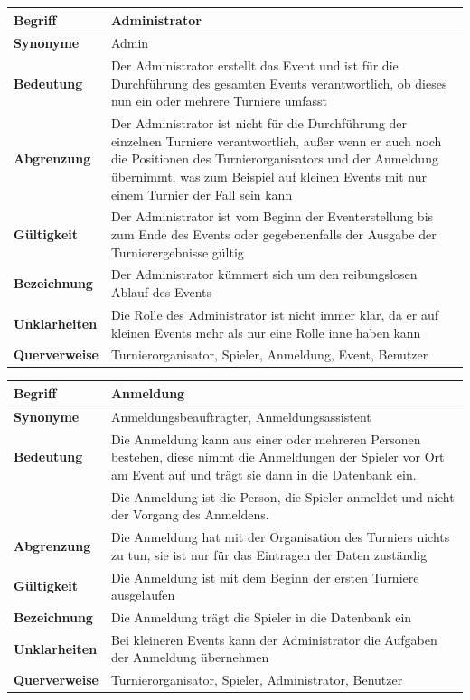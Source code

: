 \documentclass[11pt]{article}
\begin{document}
\begin{tabularx}{\textwidth}{| p{} | p{} |}
	\hline
	\textbf{Begriff} & Administrator\\
	\hline
	\textbf{Synonyme} & Admin\\
	\hline
	\textbf{Bedeutung} & Der Administrator erstellt das Event und ist für die Durchführung des gesamten Events verantwortlich, ob dieses nun ein oder mehrere Turniere umfasst\\
	\hline
	\textbf{Abgrenzung} & Der Administrator ist nicht für die Durchführung der einzelnen Turniere verantwortlich, außer wenn er auch noch die Positionen des Turnierorganisators und der Anmeldung übernimmt, was zum Beispiel auf kleinen Events mit nur einem Turnier der Fall sein kann\\
	\hline
	\textbf{Gültigkeit} & Der Administrator ist vom Beginn der Eventerstellung bis zum Ende des Events oder gegebenenfalls der Ausgabe der Turnierergebnisse gültig\\
	\hline
	\textbf{Bezeichnung} & Der Administrator kümmert sich um den reibungslosen Ablauf des Events\\
	\hline
	\textbf{Unklarheiten} & Die Rolle des Administrator ist nicht immer klar, da er auf kleinen Events mehr als nur eine Rolle inne haben kann\\
	\hline
	\textbf{Querverweise} &  Turnierorganisator, Spieler, Anmeldung, Event, Benutzer\\
	\hline
\end{tabularx}

\begin{tabularx}{\textwidth}{| p{} | p{} |}
	\hline
	\textbf{Begriff} & Anmeldung\\
	\hline
	\textbf{Synonyme} & Anmeldungsbeauftragter, Anmeldungsassistent \\
	\hline
	\textbf{Bedeutung} & Die Anmeldung kann aus einer oder mehreren Personen bestehen, diese nimmt die Anmeldungen der Spieler vor Ort am Event auf und trägt sie dann in die Datenbank ein. \\
	& Die Anmeldung ist die Person, die Spieler anmeldet und nicht der Vorgang des Anmeldens. \\
	\hline
	\textbf{Abgrenzung} & Die Anmeldung hat mit der Organisation des Turniers nichts zu tun, sie ist nur für das Eintragen der Daten zuständig\\
	\hline
	\textbf{Gültigkeit} & Die Anmeldung ist mit dem Beginn der ersten Turniere ausgelaufen\\
	\hline
	\textbf{Bezeichnung} & Die Anmeldung trägt die Spieler in die Datenbank ein\\
	\hline
	\textbf{Unklarheiten} & Bei kleineren Events kann der Administrator die Aufgaben der Anmeldung übernehmen \\
	\hline
	\textbf{Querverweise} &  Turnierorganisator, Spieler, Administrator, Benutzer\\
	\hline
\end{tabularx}
\end{document}
